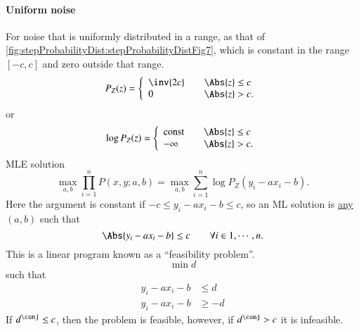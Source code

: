 \paragraph{Uniform noise}
For noise that is uniformly distributed in a range, as that of \cref{fig:stepProbabilityDist:stepProbabilityDistFig7}, which is constant in the range \( [-c,c] \) and zero outside that range.
\begin{equation}\label{eqn:L1introduction:680}
P_Z(z) =
\left\{
\begin{array}{l l}
\inv{2 c} & \quad \mbox{\( \Abs{z} \le c\)} \\
0 & \quad \mbox{\( \Abs{z} > c. \)}
\end{array}
\right.
\end{equation}
or
\begin{equation}\label{eqn:L1introduction:700}
\log P_Z(z) =
\left\{
\begin{array}{l l}
\textrm{const} & \quad \mbox{\( \Abs{z} \le c\)} \\
-\infty & \quad \mbox{\( \Abs{z} > c. \)}
\end{array}
\right.
\end{equation}
%
MLE solution
\begin{equation}\label{eqn:L1introduction:720}
\max_{a,b} \prod_{i = 1}^n P(x, y; a, b)
=
\max_{a,b} \sum_{i = 1}^n \log P_Z( y_i - a x_i - b ).
\end{equation}
%
Here the argument is constant if \( -c \le y_i - a x_i - b \le c \), so an ML solution is \underline{any} \( (a,b) \) such that
\begin{equation}\label{eqn:L1introduction:740}
\Abs{ y_i - a x_i - b } \le c \qquad \forall i \in 1, \cdots, n.
\end{equation}
%
This is a linear program known as a ``feasibility problem''.
\begin{equation}\label{eqn:L1introduction:760}
\min d
\end{equation}
such that
\begin{equation}\label{eqn:L1introduction:780}
\begin{aligned}
y_i - a x_i - b &\le d \\
y_i - a x_i - b &\ge -d
\end{aligned}
\end{equation}
%
If \( d^\conj \le c \), then the problem is feasible, however, if \( d^\conj > c \) it is infeasible.
